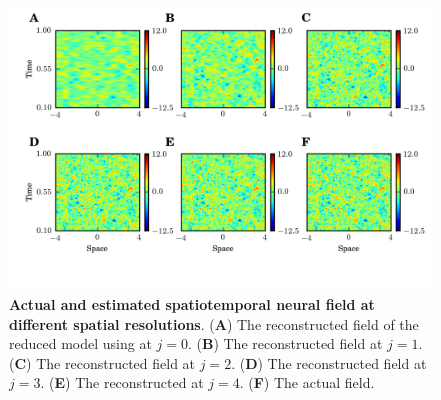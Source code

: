 \documentclass[11pt,draftcls,onecolumn,peerreview]{IEEEtran}
\begin{document}
\begin{figure}[t]
	\centering
		\includegraphics[scale=1]{./Graph/STMultiRes.png}
	\caption{{\bf Actual and estimated spatiotemporal neural field at different spatial resolutions}. (\textbf{A}) The reconstructed field of the reduced model using at $j=0$. (\textbf{B}) The reconstructed field at $j=1$. (\textbf{C}) The reconstructed field at $j=2$. (\textbf{D}) The reconstructed field at $j=3$. (\textbf{E}) The reconstructed at $j=4$. (\textbf{F}) The actual field.}
	\label{fig:FieldEstimation}
\end{figure}
\end{document}
